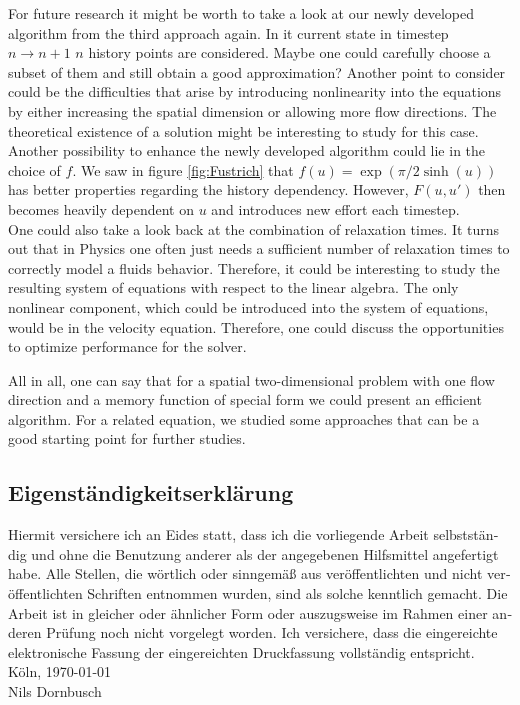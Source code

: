 \documentclass[12pt,a4paper,twoside, open=right]{scrreprt}
\theoremstyle{definition}
\theoremstyle{plain}
\begin{document}
For future research it might be worth to take a look at our newly developed algorithm from the third approach again. In it current state in timestep $n\to n+1$ $n$ history points are considered. Maybe one could carefully choose a subset of them and still obtain a good approximation? Another point to consider could be the difficulties that arise by introducing nonlinearity into the equations by either increasing the spatial dimension or allowing more flow directions. The theoretical existence of a solution might be interesting to study for this case. Another possibility to enhance the newly developed algorithm could lie in the choice of $f$. We saw in figure \ref{fig:Fustrich} that $f(u)=\exp(\pi/2\sinh(u))$ has better properties regarding the history dependency. However, $F(u,u')$ then becomes heavily dependent on $u$ and introduces new effort each timestep.\\
One could also take a look back at the combination of relaxation times. It turns out that in Physics one often just needs a sufficient number of relaxation times to correctly model a fluids behavior. Therefore, it could be interesting to study the resulting system of equations with respect to the linear algebra. The only nonlinear component, which could be introduced into the system of equations, would be in the velocity equation. Therefore, one could discuss the opportunities to optimize performance for the solver.
\par 
All in all, one can say that for a spatial two-dimensional problem with one flow direction and a memory function of special form we could present an efficient algorithm. For a related equation, we studied some approaches that can be a good starting point for further studies.
\setcounter{lofdepth}{2}
\listoffigures
\newpage
{}
\setcounter{lofdepth}{2}
\listoftables
\newpage
{}

{}
\newpage
\begin{otherlanguage}{ngerman}
\chapter*{Eigenständigkeitserklärung}
Hiermit versichere ich an Eides statt, dass ich die vorliegende Arbeit selbstständig und ohne die Benutzung anderer als der angegebenen  Hilfsmittel  angefertigt  habe.  
Alle  Stellen,  die  wörtlich  oder  sinngemäß  aus  veröffentlichten  und  nicht  veröffentlichten  Schriften  entnommen  wurden,  sind  als  solche  kenntlich  gemacht.  
Die  Arbeit  ist  in  gleicher  oder  ähnlicher  Form  oder  auszugsweise  im  Rahmen  einer  anderen  Prüfung  noch  nicht  vorgelegt  worden. 
Ich  versichere,  dass  die  eingereichte    elektronische    Fassung    der    eingereichten    Druckfassung    vollständig    entspricht.
\\[\bigskipamount]
Köln, \today
\\[2\bigskipamount]
Nils Dornbusch
\end{otherlanguage}
\end{document}
